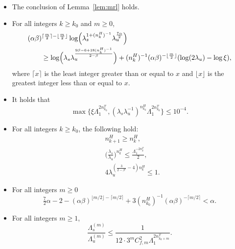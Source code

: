 \documentclass{amsart}
\theoremstyle{plain}
\theoremstyle{definition}
\theoremstyle{remark}
\numberwithin{equation}{section}
\begin{document}
\begin{itemize}
    \item The conclusion of Lemma~\ref{lem:mrl} holds.
\item For all integers $k\ge k_0$ and $m\ge 0$,
\begin{equation}\label{eq:1004}
\begin{split}
&(\alpha\beta)^{\lceil\frac{m}{2}\rceil-\lfloor\frac{m}{2}\rfloor}
\log\Bigl(\lambda_s^{1+(n_k^H)^{-1}}\lambda_u^{\frac{7\alpha}{2}}\Bigr)\\
&\qquad\ge
\log\Bigl(\lambda_s\lambda_u^{\frac{9\beta-6+18(n_k^H)^{-1}}{2-\beta}}\Bigr)
+(n_k^H)^{-1}(\alpha\beta)^{-\lfloor\frac{m}{2}\rfloor}
(\log(2\lambda_u)-\log\xi),
\end{split}
\end{equation}
    where $\lceil x\rceil$ is the least integer greater than or equal to $x$ and $\lfloor x\rfloor$ is the greatest integer less than or equal to $x$.
    \item It holds that
    \begin{equation}\label{eq:20251018b}
       \max\{\xi\Lambda_1^{2n_{k_0}^T},
      (\lambda_s\lambda_u^{-1})^{n_{k_0}^H}\Lambda_1^{2n_{k_0}^T}
      \}\le 10^{-4}.
    \end{equation}
\item For all integers $k\ge k_0$, the following hold:
\begin{subequations}
\begin{align}
&n_{k+1}^H \ge n_k^H,
\label{eq:20260314mono}
\\
&\Big(\frac{\lambda_s}{\lambda_u}\Big)^{n_k^H}
\le
\frac{\Lambda_1^{-2n_k^T}}{2},
\label{eq:20251101}
\\
&4\lambda_u^{\left(\frac{3}{2-\beta'}-4\right)n_{k}^H}
\le 1.
\label{eq:20260308}
\end{align}
\end{subequations}
\item For all integers $m\ge 0$
\begin{equation}\label{eq:lem53step3}
\tfrac{7}{2}\alpha-2
-(\alpha\beta)^{\lfloor m/2\rfloor-\lceil m/2\rceil}
+3(n_{k_0}^H)^{-1}(\alpha\beta)^{-\lceil m/2\rceil}
<\alpha.
\end{equation}
    \item 
    For all integers $m\ge 1$,
    \begin{equation}\label{eq:k0decay}
        \frac{\Lambda_{s}^{(m)}}{\Lambda_{u}^{(m)}}
        \le \frac{1}{12\cdot 3^{m} C_{f,m}^{2}\Lambda_1^{2n_{k_0+m}^T}}.
    \end{equation}
\end{itemize}
\end{document}
